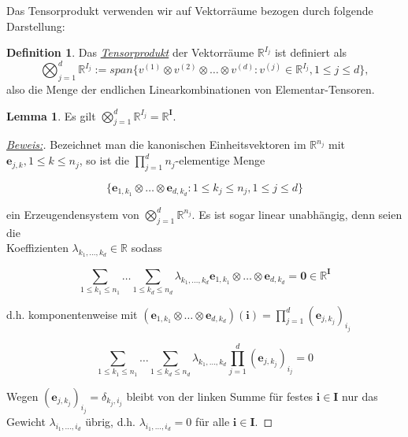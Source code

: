 \documentclass[11pt]{article} %
\theoremstyle{definition}
\newtheorem{lemma}[thm]{Lemma}
\newtheorem{definition}[thm]{Definition}
\numberwithin{equation}{section}
\begin{document}
\begin{changemargin}{0pt}{0pt}
Das Tensorprodukt verwenden wir auf Vektorräume bezogen durch folgende Darstellung:

\begin{definition}
Das \underline{\textit{Tensorprodukt}} der Vektorräume $\mathbb{R}^{I_{j}}$ ist definiert als
\begin{equation}
\bigotimes^{d}_{j=1} \mathbb{R}^{I_{j}} := span \{ v^{(1)} \otimes v^{(2)} \otimes \dots \otimes v^{(d)} : v^{(j)} \in \mathbb{R}^{I_{j}},
1\leq j \leq d \},
\end{equation} also die Menge der endlichen Linearkombinationen von Elementar-Tensoren.
\end{definition}

\newpage
\begin{lemma}
Es gilt $\bigotimes^{d}_{j=1} \mathbb{R}^{I_{j}} = \mathbb{R}^{\mathbf{I}}$.
\end{lemma}

\begin{proof}[\underline{Beweis:}\nopunct]
Bezeichnet man die kanonischen Einheitsvektoren im $\mathbb{R}^{n_{j}}$ mit $\mathbf{e}_{j,k}, 1\leq k\leq n_{j}$, so ist
die $\prod^{d}_{j=1} n_{j}$-elementige Menge

\[ \{\mathbf{e}_{1,k_{1}}\otimes \dots \otimes \mathbf{e}_{d,k_{d}} : 1\leq k_{j} \leq n_{j}, 1\leq j\leq d\} \]

ein Erzeugendensystem von $\bigotimes^{d}_{j=1} \mathbb{R}^{n_{j}}$. Es ist sogar linear unabhängig, denn seien die\\
Koeffizienten
$\lambda_{k_{1},\dots,k_{d}} \in \mathbb{R}$ sodass

\[ \sum_{1\leq k_{1}\leq n_{1}} \dots \sum_{1\leq k_{d}\leq n_{d}} \lambda_{k_{1},\dots,k_{d}} \mathbf{e}_{1,k_{1}} \otimes \dots
\otimes \mathbf{e}_{d,k_{d}} = \mathbf{0} \in \mathbb{R}^{\mathbf{I}} \]

d.h. komponentenweise mit $(\mathbf{e}_{1,k_{1}} \otimes \dots \otimes \mathbf{e}_{d,k_{d}})(\mathbf{i}) = \prod^{d}_{j=1} (\mathbf{e}_{j,k_{j}})_{i_j}$

\[ \sum_{1\leq k_{1}\leq n_{1}} \dots \sum_{1\leq k_{d}\leq n_{d}} \lambda_{k_{1},\dots,k_{d}}  \prod^{d}_{j=1} (\mathbf{e}_{j,k_{j}})_{i_j} = 0 \]

Wegen $(\mathbf{e}_{j,k_{j}})_{i_j} = \delta_{k_{j},i_{j}}$ bleibt von der linken Summe für festes $\mathbf{i} \in \mathbf{I}$ nur das Gewicht
$\lambda_{i_{1},\dots,i_{d}}$ übrig, d.h. $\lambda_{i_{1},\dots,i_{d}} = 0$ für alle $\mathbf{i} \in \mathbf{I}$.

\end{proof}

\end{changemargin}
\end{document}
